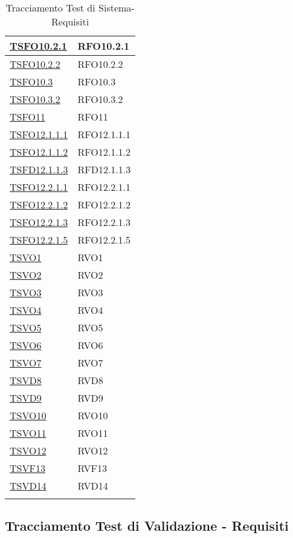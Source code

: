 \begin{longtable}{|>{\centering}m{5cm}|m{5cm}<{\centering}|}
	\hyperlink{TSFO10.2.1}{TSFO10.2.1} & RFO10.2.1\\ \hline
	\hyperlink{TSFO10.2.2}{TSFO10.2.2} & RFO10.2.2\\ \hline
	\hyperlink{TSFO10.3}{TSFO10.3} & RFO10.3\\ \hline
	\hyperlink{TSFO10.3.2}{TSFO10.3.2} & RFO10.3.2\\ \hline
	\hyperlink{TSFO11}{TSFO11} & RFO11\\ \hline
	\hyperlink{TSFO12.1.1.1}{TSFO12.1.1.1} & RFO12.1.1.1\\ \hline
	\hyperlink{TSFO12.1.1.2}{TSFO12.1.1.2} & RFO12.1.1.2\\ \hline
	\hyperlink{TSFD12.1.1.3}{TSFD12.1.1.3} & RFD12.1.1.3\\ \hline
	\hyperlink{TSFO12.2.1.1}{TSFO12.2.1.1} & RFO12.2.1.1\\ \hline
	\hyperlink{TSFO12.2.1.2}{TSFO12.2.1.2} & RFO12.2.1.2\\ \hline
	\hyperlink{TSFO12.2.1.3}{TSFO12.2.1.3} & RFO12.2.1.3\\ \hline
	\hyperlink{TSFO12.2.1.5}{TSFO12.2.1.5} & RFO12.2.1.5\\ \hline
	\hyperlink{TSVO1}{TSVO1} & RVO1\\ \hline
	\hyperlink{TSVO2}{TSVO2} & RVO2\\ \hline
	\hyperlink{TSVO3}{TSVO3} & RVO3\\ \hline
	\hyperlink{TSVO4}{TSVO4} & RVO4\\ \hline
	\hyperlink{TSVO5}{TSVO5} & RVO5\\ \hline
	\hyperlink{TSVO6}{TSVO6} & RVO6\\ \hline
	\hyperlink{TSVO7}{TSVO7} & RVO7\\ \hline
	\hyperlink{TSVD8}{TSVD8} & RVD8\\ \hline
	\hyperlink{TSVD9}{TSVD9} & RVD9\\ \hline
	\hyperlink{TSVO10}{TSVO10} & RVO10\\ \hline
	\hyperlink{TSVO11}{TSVO11} & RVO11\\ \hline
	\hyperlink{TSVO12}{TSVO12} & RVO12\\ \hline
	\hyperlink{TSVF13}{TSVF13} & RVF13\\ \hline
	\hyperlink{TSVD14}{TSVD14} & RVD14\\ \hline	
	\caption[Tracciamento Test di Sistema-Requisiti]{Tracciamento Test di Sistema-Requisiti}
	\label{tabella:ts-requi}
\end{longtable}
\clearpage

\subsection{Tracciamento Test di Validazione - Requisiti}

